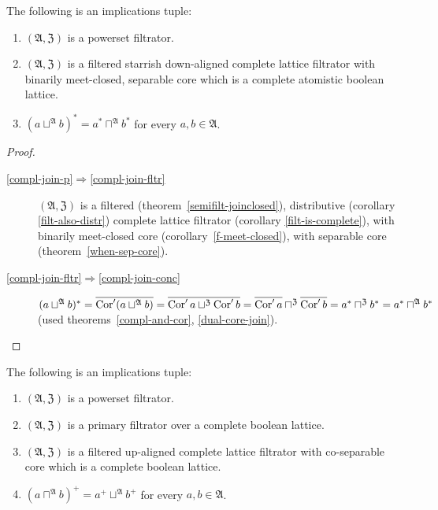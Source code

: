 \begin{thm}
\label{compl-join}The following is an implications tuple:
\begin{enumerate}
\item \label{compl-join-p}$(\mathfrak{A},\mathfrak{Z})$ is a powerset
filtrator.
\item \label{compl-join-fltr}$(\mathfrak{A},\mathfrak{Z})$ is a filtered
starrish down-aligned complete lattice filtrator with binarily meet-closed,
separable core which is a complete atomistic boolean lattice.
\item \label{compl-join-conc}$(a\sqcup^{\mathfrak{A}}b)^{\ast}=a^{\ast}\sqcap^{\mathfrak{A}}b^{\ast}$
for every $a,b\in\mathfrak{A}$.
\end{enumerate}
\end{thm}
\begin{proof}
~
\begin{description}
\item [{\ref{compl-join-p}$\Rightarrow$\ref{compl-join-fltr}}] $(\mathfrak{A},\mathfrak{Z})$
is a filtered (theorem~\ref{semifilt-joinclosed}), distributive
(corollary \ref{filt-also-distr}) complete lattice filtrator (corollary
\ref{filt-is-complete}), with binarily meet-closed core (corollary~\ref{f-meet-closed}),
with separable core (theorem~\ref{when-sep-core}).
\item [{\ref{compl-join-fltr}$\Rightarrow$\ref{compl-join-conc}}] $(a\sqcup^{\mathfrak{A}}b)^{\ast}=\overline{\operatorname{Cor}'(a\sqcup^{\mathfrak{A}}b)}=\overline{\operatorname{Cor}'a\sqcup^{\mathfrak{Z}}\operatorname{Cor}'b}=\overline{\operatorname{Cor}'a}\sqcap^{\mathfrak{Z}}\overline{\operatorname{Cor}'b}=a^{\ast}\sqcap^{\mathfrak{Z}}b^{\ast}=a^{\ast}\sqcap^{\mathfrak{A}}b^{\ast}$
(used theorems~\ref{compl-and-cor}, \ref{dual-core-join}).
\end{description}
\end{proof}

\begin{thm}
The following is an implications tuple:
\begin{enumerate}
\item \label{meet-dpseudo-p}$(\mathfrak{A},\mathfrak{Z})$ is a powerset filtrator.
\item \label{meet-dpseudo-f}$(\mathfrak{A},\mathfrak{Z})$ is a primary filtrator over a complete boolean lattice.
\item \label{meet-dpseudo-fltr}$(\mathfrak{A},\mathfrak{Z})$ is a filtered up-aligned complete lattice filtrator with
co-separable core which is a complete boolean lattice.
\item \label{meet-dpseudo-res}$(a\sqcap^{\mathfrak{A}}b)^{+}=a^{+}\sqcup^{\mathfrak{A}}b^{+}$
for every $a,b\in\mathfrak{A}$.
\end{enumerate}
\end{thm}


